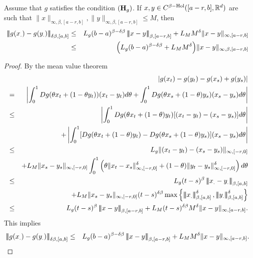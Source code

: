 \documentclass[graybox]{svmult}
\newcommand{\R}{\ensuremath{\mathbb{R}}}
\newcommand{\ltn}{\ensuremath{\left| \! \left| \! \left|}}
\newcommand{\rtn}{\ensuremath{\right| \! \right| \! \right|}}
\begin{document}
\begin{lemma}\label{lem3}
	Assume that $g$ satisfies the condition $({\textbf H}_g)$. If $x,y\in C^{\beta\rm{-Hol}}([a-r,b],\R^d)$ are such that $\|x\|_{\infty,\beta,[a-r,b]},\|y\|_{\infty,\beta,[a-r,b]}\leq M$, then 
	\begin{eqnarray}\label{lem3eq1}
	\ltn g(x_.)-g(y_.)\rtn_{\delta\beta,[a,b]} &\leq& L_g(b-a)^{\beta-\delta\beta}\ltn x-y\rtn_{\beta,[a-r,b]}+L_M M^{\delta}\|x-y\|_{\infty,[a-r,b]}\notag\\
	&\leq& \Big(L_g(b-a)^{\beta-\delta\beta} + L_M M^{\delta}\Big) \|x-y\|_{\infty,\beta,[a-r,b]}
	\end{eqnarray}
\end{lemma}
\begin{proof}
	By the mean value theorem 
	\begin{eqnarray*}
		&&|g(x_t)-g(y_t) - g(x_s)+g(y_s)|\\
		&=& \left| \int_0^1Dg(\theta x_t + (1-\theta y_t))(x_t-y_t)d\theta+\int_0^1Dg(\theta x_s + (1-\theta) y_s)(x_s-y_s)d\theta\right|\\
		&\leq&  \left| \int_0^1Dg(\theta x_t + (1-\theta) y_t)[(x_t-y_t)-(x_s-y_s)]d\theta\right|\\
		&& +\left|\int_0^1[Dg(\theta x_t + (1-\theta) y_t)-Dg(\theta x_s + (1-\theta) y_s)](x_s-y_s)d\theta\right|\\
		&\leq&  L_g \|(x_t-y_t)-(x_s-y_s)\|_{\infty,[-r,0]}\\
		&&+ L_M \|x_s-y_s\|_{\infty,[-r,0]}\int_0^1 \left(\theta \|x_t-x_s\|^\delta_{\infty,[-r,0]}+(1-\theta)\|y_t-y_s\|^\delta_{\infty,[-r,0]}\right) d\theta\\
		&\leq&  L_g (t-s)^\beta\ltn x_.-y_.\rtn_{\beta,[a,b]} \\
		&&+ L_M\|x_s-y_s\|_{\infty,[-r,0]} (t-s)^{\delta\beta}\max \left\{\ltn x_.\rtn^\delta_{\beta,[a,b]},\ltn y_.\rtn^\delta_{\beta,[a,b]}\right\}\\
		&\leq&   L_g (t-s)^\beta\ltn x-y\rtn_{\beta,[a-r,b]} + L_M(t-s)^{\delta\beta}M^{\delta}\|x-y\|_{\infty,[a-r,b]}.
	\end{eqnarray*}
	This implies 
	\begin{eqnarray*}
		\ltn g(x_.)-g(y_.)\rtn_{\delta\beta,[a,b]}
		&\leq & L_g(b-a)^{\beta-\delta\beta}\ltn x-y\rtn_{\beta,[a-r,b]}
		+ L_M M^\delta\| x-y\|_{\infty,[a-r,b]}.
	\end{eqnarray*}
\end{proof}
\end{document}
